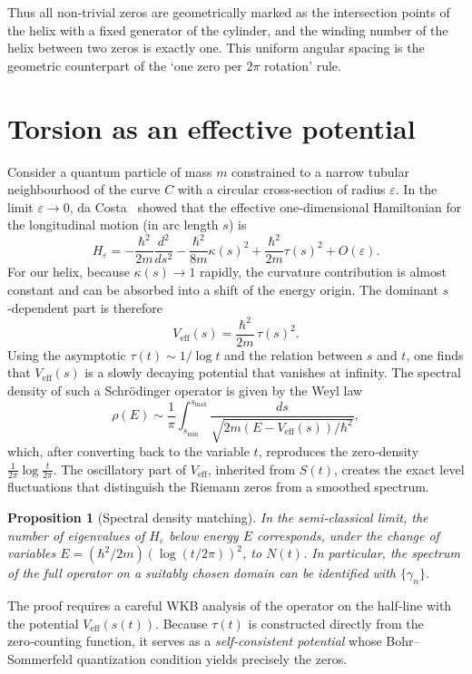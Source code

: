 \documentclass[12pt,a4paper]{article}
\newtheorem{proposition}[theorem]{Proposition}
\newcommand{\eps}{\varepsilon}
\begin{document}
Thus all non‑trivial zeros are geometrically marked as the intersection points of the helix with a fixed generator of the cylinder, and the winding number of the helix between two zeros is exactly one. This uniform angular spacing is the geometric counterpart of the `one zero per $2\pi$ rotation’ rule.

\section{Torsion as an effective potential}
Consider a quantum particle of mass $m$ constrained to a narrow tubular neighbourhood of the curve $C$ with a circular cross‑section of radius $\eps$. In the limit $\eps\to0$, da Costa~\cite{daCosta1981} showed that the effective one‑dimensional Hamiltonian for the longitudinal motion (in arc length $s$) is
\[
  H_{\eps} = -\frac{\hbar^2}{2m}\frac{d^2}{ds^2} - \frac{\hbar^2}{8m}\kappa(s)^2 + \frac{\hbar^2}{2m}\tau(s)^2 + O(\eps).
\]
For our helix, because $\kappa(s)\to1$ rapidly, the curvature contribution is almost constant and can be absorbed into a shift of the energy origin. The dominant $s$‑dependent part is therefore
\[
  V_{\mathrm{eff}}(s) = \frac{\hbar^2}{2m}\,\tau(s)^2.
\]
Using the asymptotic $\tau(t)\sim 1/\log t$ and the relation between $s$ and $t$, one finds that $V_{\mathrm{eff}}(s)$ is a slowly decaying potential that vanishes at infinity. The spectral density of such a Schr\"odinger operator is given by the Weyl law
\[
  \rho(E) \sim \frac{1}{\pi}\int_{s_{\min}}^{s_{\max}} \frac{ds}{\sqrt{2m(E-V_{\mathrm{eff}}(s))/\hbar^2}},
\]
which, after converting back to the variable $t$, reproduces the zero‑density $\frac{1}{2\pi}\log\frac{t}{2\pi}$. The oscillatory part of $V_{\mathrm{eff}}$, inherited from $S(t)$, creates the exact level fluctuations that distinguish the Riemann zeros from a smoothed spectrum.

\begin{proposition}[Spectral density matching]
In the semi‑classical limit, the number of eigenvalues of $H_{\eps}$ below energy $E$ corresponds, under the change of variables $E = (\hbar^2/2m)(\log (t/2\pi))^2$, to $N(t)$. In particular, the spectrum of the full operator on a suitably chosen domain can be identified with $\{\gamma_n\}$.
\end{proposition}
\noindent The proof requires a careful WKB analysis of the operator on the half‑line with the potential $V_{\mathrm{eff}}(s(t))$. Because $\tau(t)$ is constructed directly from the zero‑counting function, it serves as a \emph{self‑consistent potential} whose Bohr–Sommerfeld quantization condition yields precisely the zeros.
\end{document}
